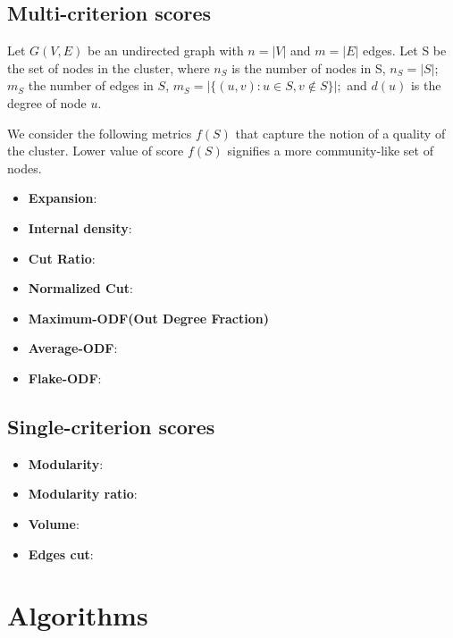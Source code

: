 \documentclass[letterpaper]{article}
\begin{document}
\subsection{Multi-criterion scores}
Let $G(V,E)$ be an undirected graph with $n=|V|$ and $m=|E|$ edges. Let S be the set of nodes in the cluster, where $n_S$ is the number of nodes in S,
$n_S=|S|$; $m_S$ the number of edges in $S$,  $m_S=|\{(u,v):u\in S, v\notin S\}|;$ and $d(u)$ is the degree of node $u$.

We consider the following metrics $f(S)$ that capture the notion of a quality of the cluster. Lower value of score $f(S)$ signifies a more community-like set of 
nodes.
\begin{itemize}
\item \textbf{Expansion}:  
\item \textbf{Internal density}:  
\item \textbf{Cut Ratio}:  
\item \textbf{Normalized Cut}:  
\item \textbf{Maximum-ODF(Out Degree Fraction)}  
\item \textbf{Average-ODF}:  
\item \textbf{Flake-ODF}: 
\end{itemize}

\subsection{Single-criterion scores}
\begin{itemize}
\item \textbf{Modularity}:
\item \textbf{Modularity ratio}:
\item \textbf{Volume}:
\item \textbf{Edges cut}:
\end{itemize}

\section{Algorithms}

\cite{test123}
 
\end{document}
